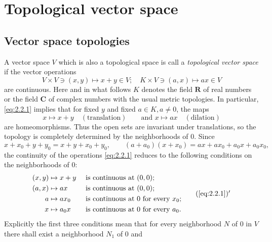 \chapter{Topological vector space}
\def\O{\mathcal{O}}
\def\V{\mathcal{V}}
\def\N{\mathcal{N}}
\def\T{\mathcal{T}}
\def\F{\mathcal{F}}
 \newcommand{\eqdef}{%
\ensuremath{\mathrel{\stackrel{\mathrm{def}}{=}}}}

\section{Vector space topologies}
A vector space $V$ which is also a topological space is call a
\emph{topological vector space} if the vector operations
\begin{equation}
  \label{eq:2.2.1}
  V\times V\ni (x,y)\mapsto x+y\in V; \quad K\times V\ni (a,x)\mapsto
  ax\in V
\end{equation}
are continuous. Here and in what follows $K$ denotes the field
$\mathbf{R}$ of real numbers or the field $\mathbf{C}$ of complex
numbers with the usual metric topologies. In particular,
\eqref{eq:2.2.1} implies that for fixed $y$ and fixed $a\in K, a\neq
0$, the maps
\begin{displaymath}
  x\mapsto x+y \quad (\text{translation})\qquad\text{and } x\mapsto ax \quad(\text{dilation})
\end{displaymath}
are homeomorphisms. Thus the open sets are invariant under
translations, so the topology is completely determined by the
neighborhoods of $0$. Since
\begin{displaymath}
  x+x_0+y+y_0=x+y+x_0+y_0,\qquad(a+a_0)(x+x_0)=ax+ax_0+a_0x+a_0x_0,
\end{displaymath}
the continuity of the operations \eqref{eq:2.2.1} reduces to the
following conditions on the neighborhoods of $0$:
\begin{equation*}
  \label{eq:2.2.1m}
  \begin{aligned}
    (x,y) &\mapsto x+y & {\ }&\text{is continuous at }(0,0);\\
    (a,x) &\mapsto ax  & {\ }&\text{is continuous at }(0,0);\\
    a &\mapsto ax_0 & {\ }&\text{is continuous at }0\text{ for every }x_0;\\
    x &\mapsto a_0x & {\ }&\text{is continuous at }0\text{ for every }a_0.
  \end{aligned}\tag*{$(\ref{eq:2.2.1})'$}
\end{equation*}
Explicitly the first three conditions mean that for every neighborhood
$N$ of $0$ in $V$ there shall exist a neighborhood $N_1$ of $0$ and
